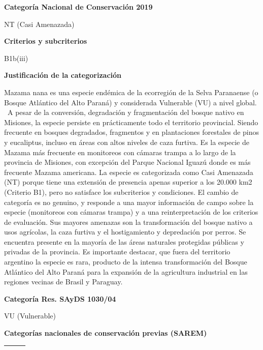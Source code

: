\documentclass[
  x11names]{article}
\begin{document}
\vspace{-0.4cm}

\textbf{Categoría Nacional de Conservación 2019}

NT (Casi Amenazada)

\textbf{Criterios y subcriterios}

B1b(iii)

\textbf{Justificación de la categorización}

Mazama nana es una especie endémica de la ecorregión de la Selva
Paranaense (o Bosque Atlántico del Alto Paraná) y considerada Vulnerable
(VU) a nivel global. ~A pesar de la conversión, degradación y
fragmentación del bosque nativo en Misiones, la especie persiste en
prácticamente todo el territorio provincial. Siendo frecuente en bosques
degradados, fragmentos y en plantaciones forestales de pinos y
eucaliptus, incluso en áreas con altos niveles de caza furtiva. Es la
especie de Mazama más frecuente en monitoreos con cámaras trampa a lo
largo de la provincia de Misiones, con excepción del Parque Nacional
Iguazú donde es más frecuente Mazama americana. La especie es
categorizada como Casi Amenazada (NT) porque tiene una extensión de
presencia apenas superior a los 20.000 km2 (Criterio B1), pero no
satisface los subcriterios y condiciones. El cambio de categoría es no
genuino, y responde a una mayor información de campo sobre la especie
(monitoreos con cámaras trampa) y a una reinterpretación de los
criterios de evaluación. Sus mayores amenazas son la transformación del
bosque nativo a usos agrícolas, la caza furtiva y el hostigamiento y
depredación por perros. Se encuentra presente en la mayoría de las áreas
naturales protegidas públicas y privadas de la provincia. Es importante
destacar, que fuera del territorio argentino la especie es rara,
producto de la intensa transformación del Bosque Atlántico del Alto
Paraná para la expansión de la agricultura industrial en las regiones
vecinas de Brasil y Paraguay.

\textbf{Categoría Res. SAyDS 1030/04}

VU (Vulnerable)

\textbf{Categorías nacionales de conservación previas (SAREM)}

\begin{tabu} to 
\toprule
\textbf{} &  & \\
\bottomrule
\end{tabu}
\end{document}

